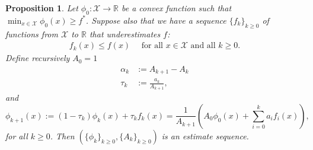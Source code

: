 \documentclass[11pt]{article}
\theoremstyle{plain}
\newtheorem{remark}{Remark}
\newtheorem{proposition}[theorem]{Proposition}
\newcommand{\R}{{\mathbb R}}
\newcommand{\X}{{\mathcal X}}
\begin{document}
\begin{proposition}\cite[2.2]{Baes09}\label{Eq:Prop}
 Let $\phi_0: \X \rightarrow \R$ be a convex function such that $\min_{x \in \X} \phi_0(x)\geq f^\ast$. Suppose also that we have a sequence $\{f_k\}_{k\geq 0}$ of functions from $\X$ to $\R$ that underestimates $f$:
\begin{align}\label{Eq:Under}
f_k(x) \leq f(x) \quad \text{ for all $x \in \X$ and all $k \geq 0$}.
\end{align}
Define recursively $A_0 = 1$ 
\begin{align}
\alpha_{k} &:= A_{k+1} - A_k \label{Eq:alpha}\\ 
\tau_k &:= \frac{a_{k}}{A_{k+1}},\label{Eq:tau}
\end{align}
and 
\begin{equation}\label{Eq:Est}
\phi_{k+1}(x) := (1 - \tau_k) \phi_k(x) + \tau_k f_k(x) = \frac{1}{A_{k+1}} \left(A_0\phi_0(x) + \sum_{i=0}^k a_i f_i(x)\right),
\end{equation}
for all $k\geq 0$. Then $\left(\{\phi_k\}_{k\geq0}, \{A_k\}_{k\geq0}\right)$ is an estimate sequence.
\end{proposition}
\end{document}
